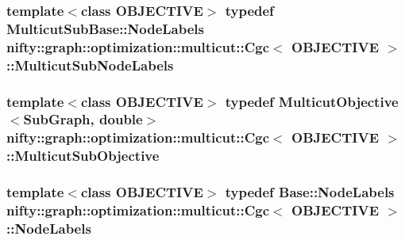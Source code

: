 \subsubsection[{Multicut\+Sub\+Node\+Labels}]{\setlength{\rightskip}{0pt plus 5cm}template$<$class O\+B\+J\+E\+C\+T\+I\+V\+E$>$ typedef {\bf Multicut\+Sub\+Base\+::\+Node\+Labels} {\bf nifty\+::graph\+::optimization\+::multicut\+::\+Cgc}$<$ O\+B\+J\+E\+C\+T\+I\+V\+E $>$\+::{\bf Multicut\+Sub\+Node\+Labels}}\label{classnifty_1_1graph_1_1optimization_1_1multicut_1_1Cgc_a9f45b9b069eeb695822654e30b29f3f2}
\hypertarget{classnifty_1_1graph_1_1optimization_1_1multicut_1_1Cgc_a437e2332f586cdb3f4ee55e3cf1ea224}{}
\subsubsection[{Multicut\+Sub\+Objective}]{\setlength{\rightskip}{0pt plus 5cm}template$<$class O\+B\+J\+E\+C\+T\+I\+V\+E$>$ typedef {\bf Multicut\+Objective}$<${\bf Sub\+Graph}, double$>$ {\bf nifty\+::graph\+::optimization\+::multicut\+::\+Cgc}$<$ O\+B\+J\+E\+C\+T\+I\+V\+E $>$\+::{\bf Multicut\+Sub\+Objective}}\label{classnifty_1_1graph_1_1optimization_1_1multicut_1_1Cgc_a437e2332f586cdb3f4ee55e3cf1ea224}
\hypertarget{classnifty_1_1graph_1_1optimization_1_1multicut_1_1Cgc_aec40bb34a73aeff370903e19e4c90ca0}{}
\subsubsection[{Node\+Labels}]{\setlength{\rightskip}{0pt plus 5cm}template$<$class O\+B\+J\+E\+C\+T\+I\+V\+E$>$ typedef {\bf Base\+::\+Node\+Labels} {\bf nifty\+::graph\+::optimization\+::multicut\+::\+Cgc}$<$ O\+B\+J\+E\+C\+T\+I\+V\+E $>$\+::{\bf Node\+Labels}}\label{classnifty_1_1graph_1_1optimization_1_1multicut_1_1Cgc_aec40bb34a73aeff370903e19e4c90ca0}
\hypertarget{classnifty_1_1graph_1_1optimization_1_1multicut_1_1Cgc_ac3e728f92d355814ff3b40b5f7d59123}{}
